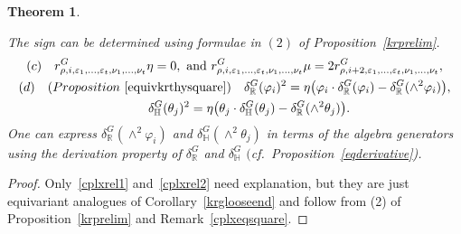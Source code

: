 \documentclass[11pt]{article}
\numberwithin{equation}{section}
\newtheorem{Theorem}{Theorem}[section]
\begin{document}
\begin{Theorem}
\begin{enumerate}
The sign can be determined using formulae in $(2)$ of Proposition~{\rm \ref{krprelim}}.
\begin{gather}
\label{cplxrel2}
(c)\quad
r^G_{\rho, i, \varepsilon_1, \dots, \varepsilon_t, \nu_1, \dots, \nu_t}\eta=0,\text{ and }
r^G_{\rho, i, \varepsilon_1,\dots, \varepsilon_t, \nu_1, \dots, \nu_t}\mu
=2r^G_{\rho, i+2, \varepsilon_1, \dots, \varepsilon_t, \nu_1, \dots,\nu_t},
\\
(d)\quad
{\rm (}Proposition~{\rm \ref{equivkrthysquare})}
\quad
\delta_\mathbb{R}^G(\varphi_i)^2
=\eta\big(\varphi_i\cdot\delta_\mathbb{R}^G(\varphi_i)-\delta_\mathbb{R}^G(\wedge^2\varphi_i)\big),
\nonumber
\\
\phantom{(d)\quad}
\delta_\mathbb{H}^G(\theta_j)^2
=\eta\big(\theta_j\cdot\delta_\mathbb{H}^G(\theta_j)-\delta_\mathbb{R}^G(\wedge^2\theta_j)\big).
\nonumber
\end{gather}
One can express $\delta_\mathbb{R}^G(\wedge^2\varphi_i)$ and $\delta_\mathbb{H}^G(\wedge^2\theta_j)$ in terms of the
algebra generators using the derivation property of $\delta_\mathbb{R}^G$ and $\delta_\mathbb{H}^G$
$($cf.\ Proposition~{\rm \ref{eqderivative})}.
\end{enumerate}
\end{Theorem}
\begin{proof}
Only~\eqref{cplxrel1} and~\eqref{cplxrel2} need explanation, but they are just equivariant analogues of
Corollary~\ref{krglooseend} and follow from (2) of Proposition~\ref{krprelim} and Remark~\ref{cplxeqsquare}.
\end{proof}
\end{document}
